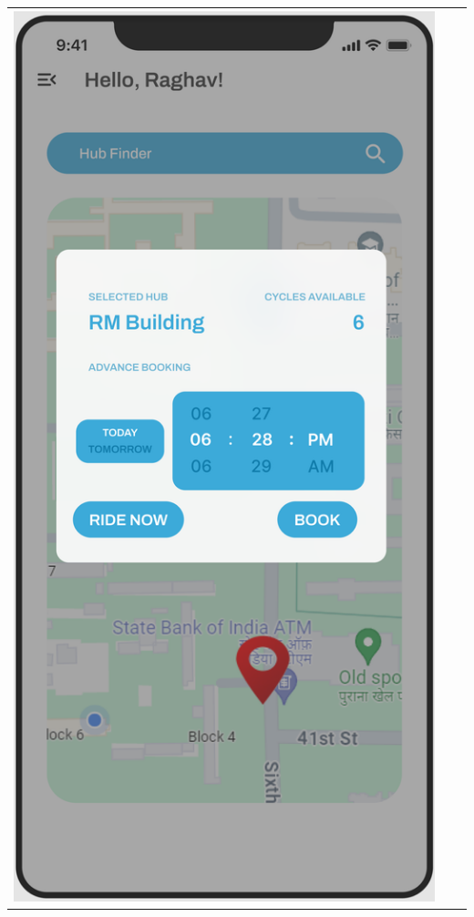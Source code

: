 \begin{center}
\begin{tabular}{ccc}
    \includegraphics[scale=0.1]{ui-images/BookRideSubscribed.png} \\

\end{tabular}
\end{center}
